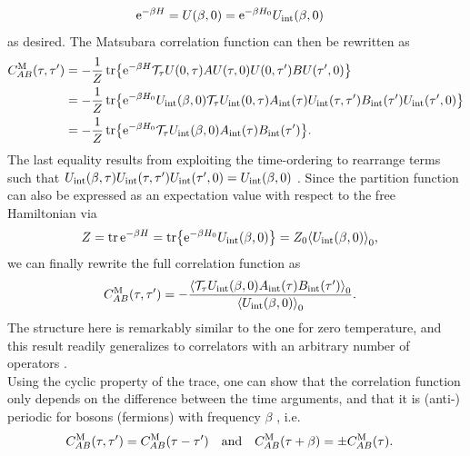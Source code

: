 \begin{align*}
\powe{-\beta H} &= U(\beta,0) = \powe{-\beta H_0} U_\tint(\beta,0)
\end{align*}
as desired.
The Matsubara correlation function can then be rewritten as
\begin{align*}
C^\M_{AB}(\tau,\tau') &= -\frac{1}{Z} \tr \klc*{ \powe{-\beta H} \mathcal{T}_\tau U(0,\tau) A U(\tau,0) U(0,\tau') B U(\tau',0) }\\
&= -\frac{1}{Z} \tr \klc*{ \powe{-\beta H_0} U_\tint(\beta,0) \mathcal{T}_\tau U_\tint(0,\tau) A_\tint(\tau) U_\tint(\tau,\tau') B_\tint(\tau') U_\tint(\tau',0)} \\
&= -\frac{1}{Z} \tr \klc*{\powe{-\beta H_0} \mathcal{T}_\tau U_\tint(\beta,0) A_\tint(\tau) B_\tint(\tau')}.
\end{align*}
The last equality results from exploiting the time-ordering to rearrange terms such that $U_\tint(\beta,\tau) U_\tint(\tau,\tau') U_\tint(\tau',0) = U_\tint(\beta,0)$ \cite[]{QMB_Fabrizio_2022}.
Since the partition function can also be expressed as an expectation value with respect to the free Hamiltonian via
\begin{align*}
Z &= \tr \powe{-\beta H} = \tr \klc*{\powe{-\beta H_0} U_\tint(\beta,0)} = Z_0 \bra*{U_\tint(\beta,0)}_0,
\end{align*}
we can finally rewrite the full correlation function as
\begin{align}
C^\M_{AB}(\tau,\tau') &= -\frac{\bra*{\mathcal{T}_\tau U_\tint(\beta,0) A_\tint(\tau) B_\tint(\tau')}_0}{\bra*{U_\tint(\beta,0)}_0}. \label{eqn:gf:correlator_Matsubara_AB_bra0_int}
\end{align}
The structure here is remarkably similar to the one for zero temperature, and this result readily generalizes to correlators with an arbitrary number of operators \cite[]{QMB_Fabrizio_2022}.\\
Using the cyclic property of the trace, one can show that the correlation function only depends on the difference between the time arguments, and that it is (anti-) periodic for bosons (fermions) with frequency $\beta$ \cite[]{QMB_Bruus_2004}, i.e.
\begin{align*}
C^\M_{AB}(\tau,\tau') &= C^\M_{AB}(\tau-\tau') \quad \text{and} \quad C^\M_{AB}(\tau+\beta) = \pm C^\M_{AB}(\tau).
\end{align*}
